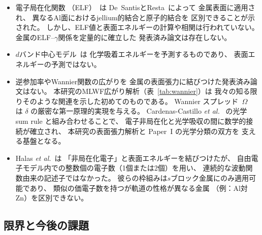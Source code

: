 \documentclass[twocolumn,showpacs,preprintnumbers,amsmath,amssymb,prb]{revtex4-2}
\begin{document}
\begin{itemize}
  \item 電子局在化関数
    （ELF）~\cite{BeckeEdgecombe1990}は
    De~SantisとResta~\cite{DeSantisResta2000}によって
    金属表面に適用され、
    異なるAl面におけるjellium的結合と原子的結合を
    区別できることが示された。
    しかし、ELF値と表面エネルギーの計算や相関は行われていない。
    金属のELF--$\gamma$関係を定量的に確立した
    発表済み論文は存在しない。
  \item $d$バンド中心モデル~\cite{Hammer1995}は
    化学吸着エネルギーを予測するものであり、
    表面エネルギーの予測ではない。
  \item 逆参加率やWannier関数の広がりを
    金属の表面張力に結びつけた発表済み論文はない。
    本研究のMLWF広がり解析（表~\ref{tab:wannier}）は
    我々の知る限りそのような関連を示した初めてのものである。
    Wannier スプレッド~$\Omega$~\cite{Marzari1997} は
    $\delta$ の厳密な第一原理的実現を与える。
    Cardenas-Castillo \textit{et al.}~\cite{CardenasCastillo2024}
    の光学 sum rule と組み合わせることで、
    電子非局在化と光学吸収の間に数学的接続が確立され、
    本研究の表面張力解析と Paper~I の光学分類の双方を
    支える基盤となる。
  \item Halas \textit{et al.}~\cite{Halas2002}は
    「非局在化電子」と表面エネルギーを結びつけたが、
    自由電子モデル内での整数個の電子数（1個または2個）を用い、
    連続的な波動関数由来の記述子ではなかった。
    彼らの枠組みは$s$ブロック金属にのみ適用可能であり、
    類似の価電子数を持つが軌道の性格が異なる金属
    （例：Al対Zn）を区別できない。
\end{itemize}

\subsection{限界と今後の課題}
\end{document}
